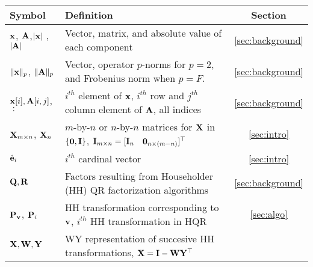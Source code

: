 \begin{table}[H]
	\centering
	\begin{tabular}{|m{}|m{10.6cm}|c|}
		\hline
		Symbol & Definition & Section \\ \hline
		${\mathbf{x}}$, ${\mathbf{A}}$,$|\mathbf{x}|$ ,$|\mathbf{A}|$  & Vector, matrix, and absolute value of each component  & \ref{sec:background} \\
		$\|{\bf x}\|_p$, $\|\mathbf{A}\|_p$ & Vector, operator $p$-norms for $p=2$, and Frobenius norm when $p=F$. & \ref{sec:background}\\
		$\mathbf{x}[i], \mathbf{A}[i,j]$,$\;:$& $i^{th}$ element of $\mathbf{x}$, $i^{th}$ row and $j^{th}$ column element of $\mathbf{A}$, all indices& \ref{sec:background}\\
		$\mathbf{X}_{m\times n}$, $\mathbf{X}_{n}$ & $m$-by-$n$ or $n$-by-$n$ matrices for $\mathbf{X}$ in $\{\mathbf{0},\mathbf{I}\}$, $\mathbf{I}_{m\times n}=[\mathbf{I}_{n} \quad \mathbf{0}_{n \times (m-n)}]^{\top}$ &  \ref{sec:intro}\\
		$\hat{\mathbf{e}}_i$  & $i^{th}$ cardinal vector &  \ref{sec:intro}\\
		\hline
		$\mathbf{Q},\mathbf{R}$  & Factors resulting from Householder (HH) QR factorization algorithms  & \ref{sec:background}\\
		$\mathbf{P}_{\mathbf{v}}$, $\mathbf{P}_i$ & HH transformation corresponding to $\mathbf{v}$, $i^{th}$ HH transformation in HQR& \ref{sec:algo}\\
		$\mathbf{X}, \mathbf{W}, \mathbf{Y}$ & WY representation of succesive HH transformations, $\mathbf{X}=\mathbf{I}-\mathbf{W}\mathbf{Y}^{\top}$ & \\

\end{tabular}
\end{table}
